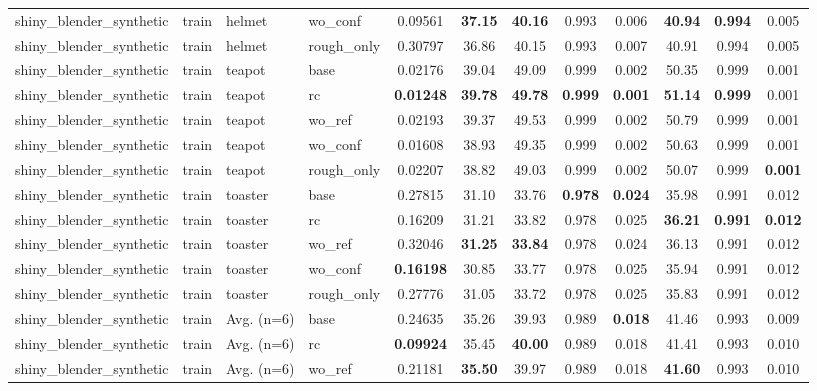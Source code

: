 \begin{table}[t]
{\begin{tabular}{llllcccccccc}
shiny\_blender\_synthetic & train & helmet & wo\_conf & 0.09561 & \textbf{37.15} & \textbf{40.16} & 0.993 & 0.006 & \textbf{40.94} & \textbf{0.994} & 0.005 \\
shiny\_blender\_synthetic & train & helmet & rough\_only & 0.30797 & 36.86 & 40.15 & 0.993 & 0.007 & 40.91 & 0.994 & 0.005 \\
shiny\_blender\_synthetic & train & teapot & base & 0.02176 & 39.04 & 49.09 & 0.999 & 0.002 & 50.35 & 0.999 & 0.001 \\
shiny\_blender\_synthetic & train & teapot & rc & \textbf{0.01248} & \textbf{39.78} & \textbf{49.78} & \textbf{0.999} & \textbf{0.001} & \textbf{51.14} & \textbf{0.999} & 0.001 \\
shiny\_blender\_synthetic & train & teapot & wo\_ref & 0.02193 & 39.37 & 49.53 & 0.999 & 0.002 & 50.79 & 0.999 & 0.001 \\
shiny\_blender\_synthetic & train & teapot & wo\_conf & 0.01608 & 38.93 & 49.35 & 0.999 & 0.002 & 50.63 & 0.999 & 0.001 \\
shiny\_blender\_synthetic & train & teapot & rough\_only & 0.02207 & 38.82 & 49.03 & 0.999 & 0.002 & 50.07 & 0.999 & \textbf{0.001} \\
shiny\_blender\_synthetic & train & toaster & base & 0.27815 & 31.10 & 33.76 & \textbf{0.978} & \textbf{0.024} & 35.98 & 0.991 & 0.012 \\
shiny\_blender\_synthetic & train & toaster & rc & 0.16209 & 31.21 & 33.82 & 0.978 & 0.025 & \textbf{36.21} & \textbf{0.991} & \textbf{0.012} \\
shiny\_blender\_synthetic & train & toaster & wo\_ref & 0.32046 & \textbf{31.25} & \textbf{33.84} & 0.978 & 0.024 & 36.13 & 0.991 & 0.012 \\
shiny\_blender\_synthetic & train & toaster & wo\_conf & \textbf{0.16198} & 30.85 & 33.77 & 0.978 & 0.025 & 35.94 & 0.991 & 0.012 \\
shiny\_blender\_synthetic & train & toaster & rough\_only & 0.27776 & 31.05 & 33.72 & 0.978 & 0.025 & 35.83 & 0.991 & 0.012 \\
shiny\_blender\_synthetic & train & Avg. (n=6) & base & 0.24635 & 35.26 & 39.93 & 0.989 & \textbf{0.018} & 41.46 & 0.993 & 0.009 \\
shiny\_blender\_synthetic & train & Avg. (n=6) & rc & \textbf{0.09924} & 35.45 & \textbf{40.00} & 0.989 & 0.018 & 41.41 & 0.993 & 0.010 \\
shiny\_blender\_synthetic & train & Avg. (n=6) & wo\_ref & 0.21181 & \textbf{35.50} & 39.97 & 0.989 & 0.018 & \textbf{41.60} & 0.993 & 0.010 \\

\end{tabular}}
\end{table}
